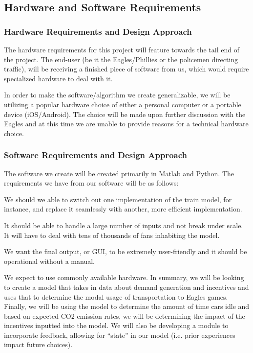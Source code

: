 \subsection{Hardware and Software Requirements}
\subsubsection{Hardware Requirements and Design Approach}
The hardware requirements for this project will feature towards the
tail end of the project.  The end-user (be it the Eagles/Phillies or
the policemen directing traffic), will be receiving a finished piece of
software from us, which would require specialized hardware to deal
with it.

In order to make the software/algorithm we create generalizable, we
will be utilizing a popular hardware choice of either a personal
computer or a portable device (iOS/Android). The choice will be made
upon further discussion with the Eagles and at this time we are unable
to provide reasons for a technical hardware choice.

\subsubsection{ Software Requirements and Design Approach}
The software we create will be created primarily in Matlab and
Python. The requirements we have from our software will be as follows:
\label{requirements}
\begin{description}[style=nextline]
    \item[Modularity] We should we able to switch out one
  implementation of the train model, for instance, and replace it
  seamlessly with another, more efficient implementation.
    \item[Scalability] It should be able to handle a large number of
  inputs and not break under scale. It will have to deal with tens of
  thousands of fans inhabiting the model.
    \item[User-Friendliness] We want the final output, or GUI, to be
  extremely user-friendly and it should be operational without a
  manual.
\end{description}

We expect to use commonly available hardware. In summary, we will be
looking to create a model that takes in data about demand generation
and incentives and uses that to determine the modal usage of
transportation to Eagles games.  Finally, we will be using the model
to determine the amount of time cars idle and based on expected CO2
emission rates, we will be determining the impact of the incentives
inputted into the model. We will also be developing a module to
incorporate feedback, allowing for ``state'' in our model (i.e. prior
experiences impact future choices).
